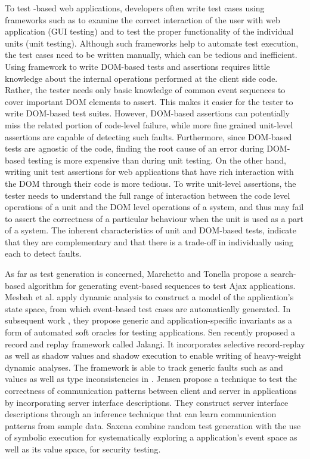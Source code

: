 To test \javascript-based web applications, developers
often write test cases using frameworks such as \selenium to examine the correct interaction of the user with web application (GUI testing) and \qunit to test the proper functionality of the individual units (unit testing).
Although such frameworks help to automate test execution, the
test cases need to be written manually, which can be tedious
and inefficient. 
Using \selenium framework to write DOM-based tests and assertions
requires little knowledge about the internal operations performed at the client side code. Rather, the tester needs only basic knowledge of common event sequences to cover important DOM elements to assert. 
This makes it easier for the tester to write DOM-based test suites. However, DOM-based assertions can potentially miss the related portion of
code-level failure, while more fine grained unit-level assertions are capable of detecting such faults. Furthermore, since DOM-based tests are agnostic of the \javascript code, finding the root cause of an error during DOM-based testing is more expensive than during unit testing. On the other hand,
writing unit test assertions for web applications that have rich interaction with the DOM through their \javascript code is more tedious. 
To write unit-level assertions, the tester needs to understand the full range of interaction between the code level operations of a unit and the DOM level operations of a system, and thus may fail to assert the correctness of a particular behaviour when the unit is used as a part of a system. The inherent characteristics of unit and DOM-based tests, indicate that they are complementary and that there is a trade-off in individually using each to detect faults. 

As far as test generation is concerned, Marchetto and Tonella \cite{marchetto:search} propose a search-based algorithm for generating event-based sequences to test Ajax applications. 
Mesbah et al.  \cite{mesbah:tweb11} apply dynamic analysis to construct a model of the application's state space, from which event-based test cases are automatically generated. In subsequent work \cite{mesbah:tse12}, they propose generic and application-specific invariants as a form of automated soft oracles for testing \ajax applications.
Sen \etal \cite{sen:fse13} recently proposed a record and replay framework called Jalangi. It incorporates selective record-replay as well as shadow values and shadow execution to enable writing of heavy-weight dynamic analyses.
The framework is able to track generic faults such as  and  values as well as type inconsistencies in \javascript. 
Jensen \etal \cite{jensen:fse13} propose a technique to test the correctness of communication patterns between client and server in \ajax applications by incorporating server interface descriptions.
They construct server interface descriptions through an inference technique that can learn communication patterns from sample data.
Saxena \etal \cite{song:symb10} combine random test generation with the use of symbolic execution for systematically exploring a \javascript application's event space as well as its value space, for security testing.

